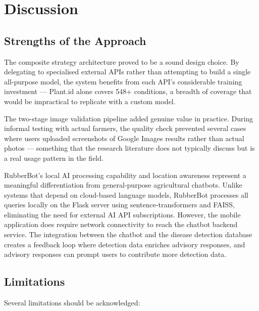 \section{Discussion}

\subsection{Strengths of the Approach}

The composite strategy architecture proved to be a sound design choice. By delegating to specialised external APIs rather than attempting to build a single all-purpose model, the system benefits from each API's considerable training investment --- Plant.id alone covers 548+ conditions, a breadth of coverage that would be impractical to replicate with a custom model.

The two-stage image validation pipeline added genuine value in practice. During informal testing with actual farmers, the quality check prevented several cases where users uploaded screenshots of Google Images results rather than actual photos --- something that the research literature does not typically discuss but is a real usage pattern in the field.

RubberBot's local AI processing capability and location awareness represent a meaningful differentiation from general-purpose agricultural chatbots. Unlike systems that depend on cloud-based language models, RubberBot processes all queries locally on the Flask server using sentence-transformers and FAISS, eliminating the need for external AI API subscriptions. However, the mobile application does require network connectivity to reach the chatbot backend service. The integration between the chatbot and the disease detection database creates a feedback loop where detection data enriches advisory responses, and advisory responses can prompt users to contribute more detection data.

\subsection{Limitations}

Several limitations should be acknowledged:

